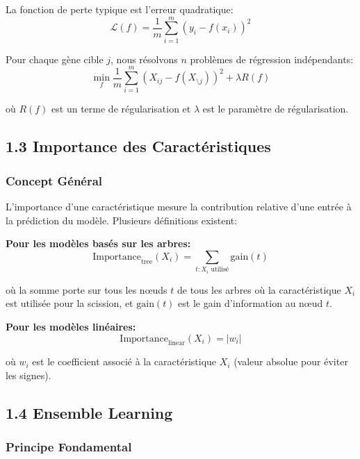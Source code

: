 \documentclass[12pt,a4paper,french]{article}
\begin{document}
La fonction de perte typique est l'erreur quadratique:
\begin{equation}
\mathcal{L}(f) = \frac{1}{m} \sum_{i=1}^{m} (y_i - f(x_i))^2
\end{equation}

Pour chaque gène cible $j$, nous résolvons $n$ problèmes de régression indépendants:
\begin{equation}
\min_f \frac{1}{m} \sum_{i=1}^{m} (X_{ij} - f(X_{\setminus j}))^2 + \lambda R(f)
\end{equation}

où $R(f)$ est un terme de régularisation et $\lambda$ est le paramètre de régularisation.

\subsection{1.3 Importance des Caractéristiques}

\subsubsection{Concept Général}

L'importance d'une caractéristique mesure la contribution relative d'une entrée à la prédiction du modèle. Plusieurs définitions existent:

\textbf{Pour les modèles basés sur les arbres:}
\begin{equation}
\text{Importance}_{\text{tree}}(X_i) = \sum_{t: X_i \text{ utilisé}} \text{gain}(t)
\end{equation}

où la somme porte sur tous les nœuds $t$ de tous les arbres où la caractéristique $X_i$ est utilisée pour la scission, et $\text{gain}(t)$ est le gain d'information au nœud $t$.

\textbf{Pour les modèles linéaires:}
\begin{equation}
\text{Importance}_{\text{linear}}(X_i) = |w_i|
\end{equation}

où $w_i$ est le coefficient associé à la caractéristique $X_i$ (valeur absolue pour éviter les signes).

\subsection{1.4 Ensemble Learning}

\subsubsection{Principe Fondamental}
\end{document}
